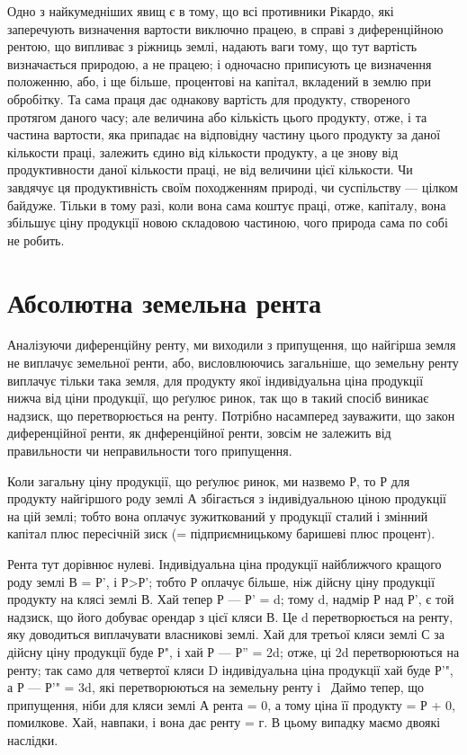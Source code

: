 
Одно з найкумедніших явищ є в тому, що всі противники Рікардо, які
заперечують визначення вартости виключно працею, в справі з диференційною
рентою, що випливає з ріжниць землі, надають ваги тому, що тут вартість
визначається природою, а не працею; і одночасно приписують це визначення
положенню, або, і ще більше, процентові на капітал, вкладений в землю при
обробітку. Та сама праця дає однакову вартість для продукту, створеного
протягом даного часу; але величина або кількість цього продукту, отже, і та
частина вартости, яка припадає на відповідну частину цього продукту за даної
кількости праці, залежить єдино від кількости продукту, а це знову від продуктивности
даної кількости праці, не від величини цієї кількости. Чи завдячує
ця продуктивність своїм походженням природі, чи суспільству — цілком байдуже.
Тільки в тому разі, коли вона сама коштує праці, отже, капіталу, вона
збільшує ціну продукції новою складовою частиною, чого природа сама по собі
не робить.

\section{Абсолютна земельна рента}

Аналізуючи диференційну ренту, ми виходили з припущення, що найгірша
земля не виплачує земельної ренти, або, висловлюючись загальніше, що земельну
ренту виплачує тільки така земля, для продукту якої індивідуальна ціна продукції
нижча від ціни продукції, що реґулює ринок, так що в такий спосіб
виникає надзиск, що перетворюється на ренту. Потрібно насамперед зауважити,
що закон диференційної ренти, як днференційної ренти, зовсім не залежить від
правильности чи неправильности того припущення.

Коли загальну ціну продукції, що реґулює ринок, ми назвемо Р, то Р для
продукту найгіршого роду землі А збігається з індивідуальною ціною продукції
на цій землі; тобто вона оплачує зужиткований у продукції сталий і змінний капітал
плюс пересічній зиск (= підприємницькому баришеві плюс процент).

Рента тут дорівнює нулеві. Індивідуальна ціна продукції найближчого
кращого роду землі В = Р', і Р>Р'; тобто Р оплачує більше, ніж дійсну
ціну продукції продукту на клясі землі В. Хай тепер Р — Р' = d; тому
d, надмір Р над Р', є той надзиск, що його добуває орендар з цієї кляси В.
Це d перетворюється на ренту, яку доводиться виплачувати власникові землі.
Хай для третьої кляси землі С за дійсну ціну продукції буде Р", і хай Р —
Р'' = 2d; отже, ці 2d перетворюються на ренту; так само для четвертої кляси
D індивідуальна ціна продукції хай буде Р'", а Р — Р'" = 3d, які перетворюються
на земельну ренту і~ Даймо тепер, що припущення, ніби для
кляси землі А рента = 0, а тому ціна її продукту = Р + 0, помилкове. Хай,
навпаки, і вона дає ренту = г. В цьому випадку маємо двоякі наслідки.


